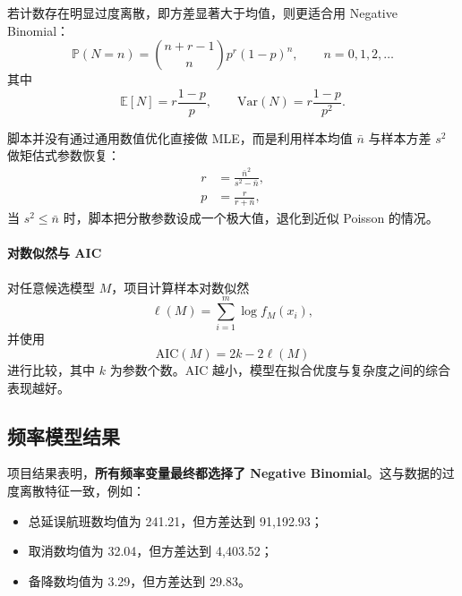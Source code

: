 若计数存在明显过度离散，即方差显著大于均值，则更适合用 Negative Binomial：
\begin{equation}
\mathbb{P}(N=n) = \binom{n+r-1}{n} p^r (1-p)^n, \qquad n=0,1,2,\dots
\end{equation}
其中
\begin{equation}
\mathbb{E}[N] = r\frac{1-p}{p}, \qquad
\mathrm{Var}(N) = r\frac{1-p}{p^2}.
\end{equation}

脚本并没有通过通用数值优化直接做 MLE，而是利用样本均值 $\bar{n}$ 与样本方差 $s^2$ 做矩估式参数恢复：
\begin{align}
r &= \frac{\bar{n}^2}{s^2-\bar{n}}, \\
p &= \frac{r}{r+\bar{n}},
\end{align}
当 $s^2 \le \bar{n}$ 时，脚本把分散参数设成一个极大值，退化到近似 Poisson 的情况。

\paragraph{对数似然与 AIC}

对任意候选模型 $M$，项目计算样本对数似然
\begin{equation}
\ell(M) = \sum_{i=1}^{m}\log f_M(x_i),
\end{equation}
并使用
\begin{equation}
\mathrm{AIC}(M) = 2k - 2\ell(M)
\end{equation}
进行比较，其中 $k$ 为参数个数。AIC 越小，模型在拟合优度与复杂度之间的综合表现越好。

\subsection{频率模型结果}

项目结果表明，\textbf{所有频率变量最终都选择了 Negative Binomial}。这与数据的过度离散特征一致，例如：
\begin{itemize}[leftmargin=2.2em]
  \item 总延误航班数均值为 241.21，但方差达到 91{,}192.93；
  \item 取消数均值为 32.04，但方差达到 4{,}403.52；
  \item 备降数均值为 3.29，但方差达到 29.83。
\end{itemize}

